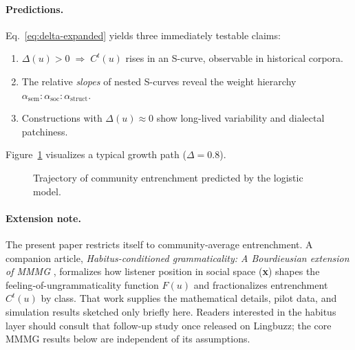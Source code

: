 \documentclass[12pt]{article}
\begin{document}
\paragraph{Predictions.}
Eq.~\eqref{eq:delta-expanded} yields three immediately testable claims:

\begin{enumerate}
  \item $\Delta(u)\!>\!0 \;\Rightarrow\; C^{t}(u)$ rises in an S-curve, observable in historical corpora.
  \item The relative \emph{slopes} of nested S-curves reveal the weight hierarchy $\alpha_{\text{sem}}{:}\alpha_{\text{soc}}{:}\alpha_{\text{struct}}$.
  \item Constructions with $\Delta(u)\!\approx\!0$ show long-lived variability and dialectal patchiness.
\end{enumerate}

Figure~\ref{fig:trajectory} visualizes a typical growth path ($\Delta\!=\!0.8$).

\begin{figure}[t]
  \centering
  \caption{Trajectory of community entrenchment predicted by the
    logistic model.}
  \label{fig:trajectory}
\end{figure}

\paragraph{Extension note.}  
The present paper restricts itself to community‐average entrenchment.  
A companion article, \emph{Habitus-conditioned grammaticality: A Bourdieusian extension of MMMG} \autocite{Reynolds_inprep}, formalizes how listener position in social space (\textbf{x}) shapes the feeling‐of-ungrammaticality function $F(u)$ and fractionalizes entrenchment $C^{t}(u)$ by class.  That work supplies the mathematical details, pilot data, and simulation results sketched only briefly here.  Readers interested in the habitus layer should consult that follow-up study once released on Lingbuzz; the core MMMG results below are independent of its assumptions.
\end{document}
